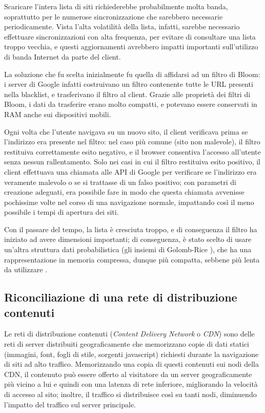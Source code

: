 Scaricare l'intera lista di siti richiederebbe probabilmente molta banda, soprattutto per le
numerose sincronizzazione che sarebbero necessarie periodicamente. Vista l'alta volatilità della
lista, infatti, sarebbe necessario effettuare sincronizzazioni con alta frequenza, per evitare di
consultare una lista troppo vecchia, e questi aggiornamenti avrebbero impatti importanti
sull'utilizzo di banda Internet da parte del client.

La soluzione che fu scelta inizialmente fu quella di affidarsi ad un filtro di Bloom: i server
di Google infatti costruivano un filtro contenente tutte le URL presenti nella blacklist, e
trasferivano il filtro al client. Grazie alle proprietà dei filtri di Bloom, i dati da trasferire
erano molto compatti, e potevano essere conservati in RAM anche sui dispositivi mobili.

Ogni volta che l'utente navigava su un nuovo sito, il client verificava prima se l'indirizzo era
presente nel filtro: nel caso più comune (sito non malevole), il filtro restituiva correttamente
esito negativo, e il browser consentiva l'accesso all'utente senza nessun rallentamento. Solo nei
casi in cui il filtro restituiva esito positivo, il client effettuava una chiamata alle API di
Google per verificare se l'indirizzo era veramente malevolo o se si trattasse di un falso positivo;
con parametri di creazione adeguati, era possibile fare in modo che questa chiamata avvenisse
pochissime volte nel corso di una navigazione normale, impattando così il meno possibile i tempi
di apertura dei siti.

Con il passare del tempo, la lista è cresciuta troppo, e di conseguenza il filtro ha iniziato
ad avere dimensioni importanti; di conseguenza, è stato scelto di usare un'altra struttura dati
probabilistica (gli insiemi di Golomb-Rice \cite{golomb,rice,golomb-rice}), che ha una rappresentazione in memoria
compressa, dunque più compatta, sebbene più lenta da utilizzare \cite{golomb-safebrowsing}. 

\subsection{Riconciliazione di una rete di distribuzione con\-te\-nu\-ti}
\label{sec:bloomcdn}

Le reti di distribuzione contenuti (\emph{Content Delivery Network} o \emph{CDN}) sono delle reti
di server distribuiti geograficamente che memorizzano copie di dati statici (immagini, font, 
fogli di stile, sorgenti javascript) richiesti durante la navigazione di siti ad alto traffico. 
Memorizzando una copia di questi contenuti sui nodi della CDN, il contenuto può essere offerto
al visitatore da un server geograficamente più vicino a lui e quindi con una latenza di rete
inferiore, migliorando la velocità di accesso al sito; inoltre, il traffico si distribuisce
così su tanti nodi, diminuendo l'impatto del traffico sul server principale.

